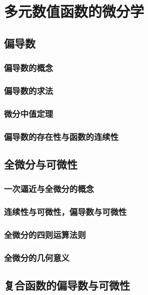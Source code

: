 

\chapter{多元数值函数的微分学}\label{ch:16}
\section{偏导数}
\subsection{偏导数的概念}
\subsection{偏导数的求法}
\subsection{微分中值定理}
\subsection{偏导数的存在性与函数的连续性}
\begin{exercise}
\item
\end{exercise}
\section{全微分与可微性}
\subsection{一次逼近与全微分的概念}
\subsection{连续性与可微性，偏导数与可微性}
\subsection{全微分的四则运算法则}
\subsection{全微分的几何意义}
\begin{exercise}
\item
\end{exercise}
\section{复合函数的偏导数与可微性}
